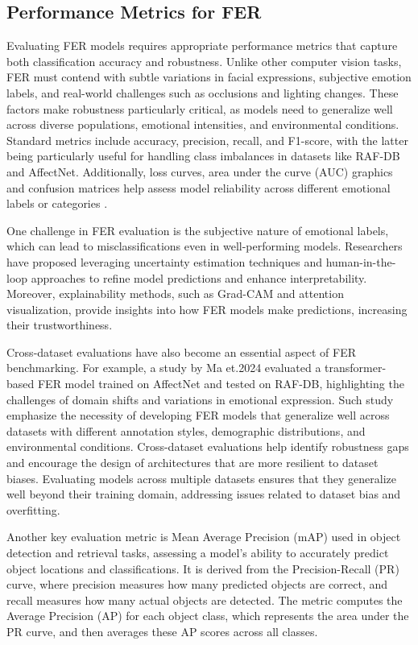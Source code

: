 \subsection{Performance Metrics for FER}

Evaluating \gls{FER} models requires appropriate performance metrics that capture both classification accuracy and robustness. Unlike other computer vision tasks, \gls{FER} must contend with subtle variations in facial expressions, subjective emotion labels, and real-world challenges such as occlusions and lighting changes. These factors make robustness particularly critical, as models need to generalize well across diverse populations, emotional intensities, and environmental conditions. Standard metrics include accuracy, precision, recall, and F1-score, with the latter being particularly useful for handling class imbalances in datasets like RAF-DB and AffectNet. Additionally, loss curves, area under the curve (AUC) graphics and confusion matrices help assess model reliability across different emotional labels or categories \cite{ma_facial_2023}.

One challenge in \gls{FER} evaluation is the subjective nature of emotional labels, which can lead to misclassifications even in well-performing models. Researchers have proposed leveraging uncertainty estimation techniques and human-in-the-loop approaches to refine model predictions and enhance interpretability. Moreover, explainability methods, such as Grad-CAM \cite{selvaraju_grad-cam_2020} and attention visualization, provide insights into how \gls{FER} models make predictions, increasing their trustworthiness.

Cross-dataset evaluations have also become an essential aspect of \gls{FER} benchmarking. For example, a study by Ma et.2024 \cite{ma_facial_2023} evaluated a transformer-based \gls{FER} model trained on AffectNet and tested on RAF-DB, highlighting the challenges of domain shifts and variations in emotional expression. Such study emphasize the necessity of developing \gls{FER} models that generalize well across datasets with different annotation styles, demographic distributions, and environmental conditions. Cross-dataset evaluations help identify robustness gaps and encourage the design of architectures that are more resilient to dataset biases. Evaluating models across multiple datasets ensures that they generalize well beyond their training domain, addressing issues related to dataset bias and overfitting. 

Another key evaluation metric is Mean Average Precision (mAP)  used in object detection and retrieval tasks, assessing a model’s ability to accurately predict object locations and classifications. It is derived from the Precision-Recall (PR) curve, where precision measures how many predicted objects are correct, and recall measures how many actual objects are detected. The metric computes the Average Precision (AP) for each object class, which represents the area under the PR curve, and then averages these AP scores across all classes\cite{marcu_pitfalls_2022, ranjan_light-weight_2018}.


